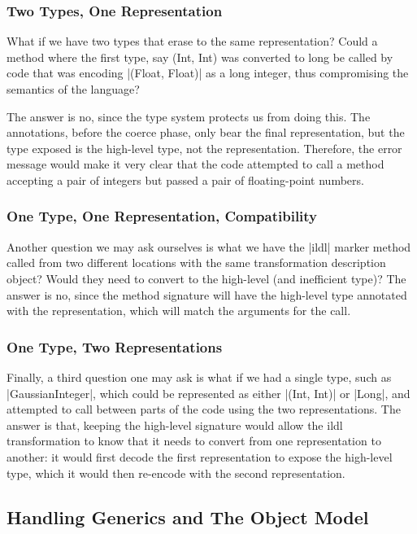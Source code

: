 \subsubsection{Two Types, One Representation}

What if we have two types that erase to the same representation? Could a method where the first type, say (Int, Int) was converted to long be called by code that was encoding |(Float, Float)| as a long integer, thus compromising the semantics of the language?

The answer is no, since the type system protects us from doing this. The annotations, before the coerce phase, only bear the final representation, but the type exposed is the high-level type, not the representation. Therefore, the error message would make it very clear that the code attempted to call a method accepting a pair of integers but passed a pair of floating-point numbers.

\subsubsection{One Type, One Representation, Compatibility}

Another question we may ask ourselves is what we have the |ildl| marker method called from two different locations with the same transformation description object? Would they need to convert to the high-level (and inefficient type)? The answer is no, since the method signature will have the high-level type annotated with the representation, which will match the arguments for the call.

\subsubsection{One Type, Two Representations}

Finally, a third question one may ask is what if we had a single type, such as |GaussianInteger|, which could be represented as either |(Int, Int)| or |Long|, and attempted to call between parts of the code using the two representations. The answer is that, keeping the high-level signature would allow the ildl transformation to know that it needs to convert from one representation to another: it would first decode the first representation to expose the high-level type, which it would then re-encode with the second representation.


\subsection{Handling Generics and The Object Model}
\label{sec:ildl:generics}

